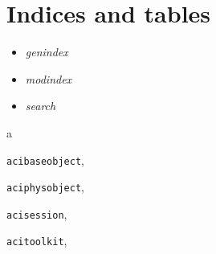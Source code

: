 \documentclass[letterpaper,10pt,english]{sphinxmanual}
\begin{document}
\chapter{Indices and tables}
\label{index:indices-and-tables}\begin{itemize}
\item {} 
\emph{genindex}

\item {} 
\emph{modindex}

\item {} 
\emph{search}

\end{itemize}


\renewcommand{\indexname}{Python Module Index}
\begin{theindex}
\def\bigletter#1{{\Large\sffamily#1}\nopagebreak\vspace{1mm}}
\bigletter{a}
\item {\texttt{acibaseobject}}, \pageref{acibaseobject:module-acibaseobject}
\item {\texttt{aciphysobject}}, \pageref{aciphysobject:module-aciphysobject}
\item {\texttt{acisession}}, \pageref{acisession:module-acisession}
\item {\texttt{acitoolkit}}, \pageref{acitoolkit:module-acitoolkit}
\end{theindex}

\renewcommand{\indexname}{Index}
\printindex
\end{document}
